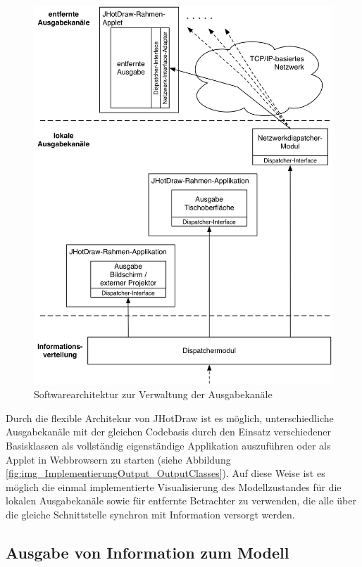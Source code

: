 \begin{figure}[htbp]
	\centering
		\includegraphics[width=\textwidth]{img/ImplementierungOutput/OutputArchitecture.png}
	\caption{Softwarearchitektur zur Verwaltung der Ausgabekanäle}
	\label{fig:img_ImplementierungOutput_OutputArchitecture}
\end{figure}

Durch die flexible Architekur von JHotDraw ist es möglich, unterschiedliche Ausgabekanäle mit der gleichen Codebasis durch den Einsatz verschiedener Basisklassen als vollständig eigenständige Applikation auszuführen oder als Applet in Webbrowsern zu starten (siehe Abbildung \ref{fig:img_ImplementierungOutput_OutputClasses}). Auf diese Weise ist es möglich die einmal implementierte Visualisierung des Modellzustandes für die lokalen Ausgabekanäle sowie für entfernte Betrachter zu verwenden, die alle über die gleiche Schnittstelle synchron mit Information versorgt werden.


\subsection{Ausgabe von Information zum Modell} %
\label{sub:ausgabe_von_information_zum_modell}

